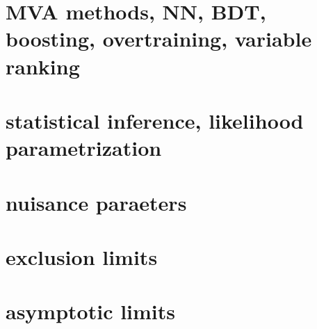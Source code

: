 \section{ MVA methods, NN, BDT, boosting, overtraining, variable ranking  }
\section{statistical inference, likelihood parametrization}
\section{ nuisance paraeters}
\section{exclusion limits }
\section{asymptotic limits }













